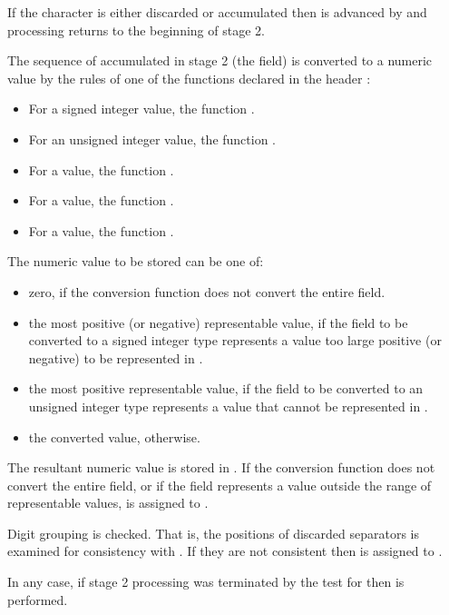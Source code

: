\begin{itemdescr}
\begin{description}
If the character is either discarded or accumulated
then  is advanced by 
and processing returns to the beginning of stage 2.

The sequence of  accumulated in stage 2 (the field)
is converted to a numeric value by the rules of one of the functions
declared in the header :

\begin{itemize}
\item
For a signed integer value, the function .
\item
For an unsigned integer value, the function .
\item
For a  value, the function .
\item
For a  value, the function .
\item
For a  value, the function .
\end{itemize}

The numeric value to be stored can be one of:
\begin{itemize}
\item
zero, if the conversion function does not convert the entire field.
\item
the most positive (or negative) representable value,
if the field to be converted to a signed integer type represents a value
too large positive (or negative) to be represented in .
\item
the most positive representable value,
if the field to be converted to an unsigned integer type represents a value
that cannot be represented in .
\item
the converted value, otherwise.
\end{itemize}

The resultant numeric value is stored in .
If the conversion function does not convert the entire field, or
if the field represents a value outside the range of representable values,
 is assigned to .

\end{description}

\pnum
Digit grouping is checked.
That is, the positions of discarded
separators is examined for consistency with
.
If they are not consistent
then  is assigned to .

\pnum
In any case,
if stage 2 processing was terminated by the test for 
then  is performed.
\end{itemdescr}

